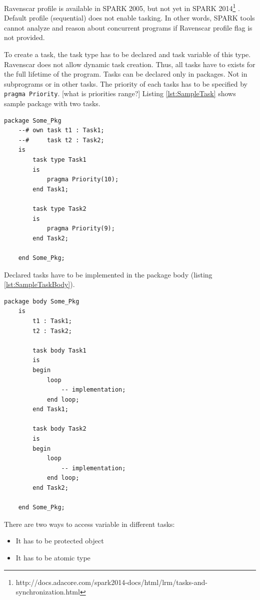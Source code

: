 Ravenscar profile is available in SPARK 2005, but not yet in SPARK 2014\footnote{http://docs.adacore.com/spark2014-docs/html/lrm/tasks-and-synchronization.html} \cite{Spark2014refManual:Online}. Default profile (sequential) does not enable tasking. In other words, SPARK tools cannot analyze and reason about concurrent programs if Ravenscar profile flag is not provided.

To create a task, the task type has to be declared and task variable of this type. Ravenscar does not allow dynamic task creation. Thus, all tasks have to exists for the full lifetime of the program. \cite{IssuesWithRavenscar:Paper} Tasks can be declared only in packages. Not in subprograms or in other tasks. \cite{Barnes:Book} The priority of each tasks has to be specified by \lstinline{pragma Priority}. [what is priorities range?] Listing \ref{lst:SampleTask} shows sample package with two tasks.

\singlespacing
\begin{lstlisting}[frame=single, gobble=0, caption={Sample tasks}, label={lst:SampleTask}]
	package Some_Pkg
	--# own task t1 : Task1;
	--#     task t2 : Task2;
	is
		task type Task1
		is
			pragma Priority(10);
		end Task1;

		task type Task2
		is
			pragma Priority(9);
		end Task2;

	end Some_Pkg;
\end{lstlisting} 
\doublespacing

Declared tasks have to be implemented in the package body (listing \ref{lst:SampleTaskBody}).

\singlespacing
\begin{lstlisting}[frame=single, gobble=0, caption={Sample tasks body}, label={lst:SampleTaskBody}]
	package body Some_Pkg
	is
		t1 : Task1;
		t2 : Task2;

		task body Task1
		is
		begin
			loop
				-- implementation;
			end loop;
		end Task1;

		task body Task2
		is
		begin
			loop
				-- implementation;
			end loop;
		end Task2;

	end Some_Pkg;
\end{lstlisting} 
\doublespacing

There are two ways to access variable in different tasks:
\begin{itemize}
    \item It has to be protected object
    \item It has to be atomic type
\end{itemize}

